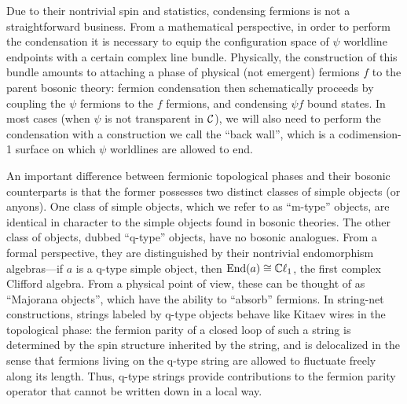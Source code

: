 Due to their nontrivial spin and statistics, condensing fermions is not a straightforward business. 
From a mathematical perspective, in order to perform the condensation it is necessary to equip the configuration 
space of $\psi$ worldline endpoints with a certain complex line bundle. 
Physically, the construction of this bundle amounts to attaching a phase of physical (not emergent) fermions $f$ 
to the parent bosonic theory: 
fermion condensation then schematically proceeds by coupling the $\psi$ fermions to 
the $f$ fermions, and condensing $\psi f$ bound states. 
In most cases (when $\psi$ is not transparent in $\mathcal{C}$), we will also need to perform 
the condensation with a construction we call the ``back wall'', which is a codimension-1 surface 
on which $\psi$ worldlines are allowed to end. 


An important difference between fermionic topological phases and their bosonic counterparts is that 
the former possesses two distinct classes of simple objects (or anyons). 
One class of simple objects, which we refer to as ``m-type'' objects, are identical in character
to the simple objects found in bosonic theories. 
The other class of objects, dubbed ``q-type'' objects, have no bosonic analogues. 
From a formal perspective, they are distinguished by their nontrivial endomorphism algebras---if 
$a$ is a q-type simple object, then $\text{End}(a) \cong \mathbb{C}\ell_1$, the first complex Clifford algebra. 
From a physical point of view, these can be thought of as ``Majorana objects'', which have the ability 
to ``absorb'' fermions. 
In string-net constructions, strings labeled by q-type objects behave like Kitaev wires in the 
topological phase: the fermion parity of a closed loop of such a string is determined by 
the spin structure inherited by the string, and is delocalized in the sense that fermions living on the q-type string are allowed to fluctuate freely along its length.
Thus, q-type strings provide contributions to the fermion parity operator that cannot be written down 
in a local way. 

